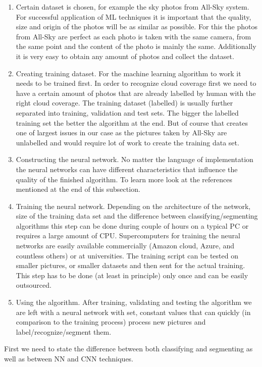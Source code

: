 \documentclass[]{book}
\begin{document}
		\begin{enumerate}
			\item Certain dataset is chosen, for example the sky photos from All-Sky system. For successful application of ML techniques it is important that the quality, size and origin of the photos will be as similar as possible. For this the photos from All-Sky are perfect as each photo is taken with the same camera, from the same point and the content of the photo is mainly the same. Additionally it is very easy to obtain any amount of photos and collect the dataset.
			\item Creating training dataset. For the machine learning algorithm to work it needs to be trained first. In order to recognize cloud coverage first we need to have a certain amount of photos that are already labelled by human with the right cloud coverage. The training dataset (labelled) is usually further separated into training, validation and test sets. The bigger the labelled training set the better the algorithm at the end. But of course that creates one of largest issues in our case as the pictures taken by All-Sky are unlabelled and would require lot of work to create the training data set.
			\item Constructing the neural network. No matter the language of implementation the neural networks can have different characteristics that influence the quality of the finished algorithm. To learn more look at the references mentioned at the end of this subsection.
			\item Training the neural network. Depending on the architecture of the network, size of the training data set and the difference between classifying/segmenting algorithms this step can be done during couple of hours on a typical PC or requires a large amount of CPU. Supercomputers for training the neural networks are easily available commercially (Amazon cloud, Azure, and countless others) or at universities. The training script can be tested on smaller pictures, or smaller datasets and then sent for the actual training. This step has to be done (at least in principle) only once and can be easily outsourced.
			\item Using the algorithm. After training, validating and testing the algorithm we are left with a neural network with set, constant values that can quickly (in comparison to the training process) process new pictures and label/recognize/segment them.
		\end{enumerate}
		
		First we need to state the difference between both classifying and segmenting as well as between NN and CNN techniques.
		
\end{document}
